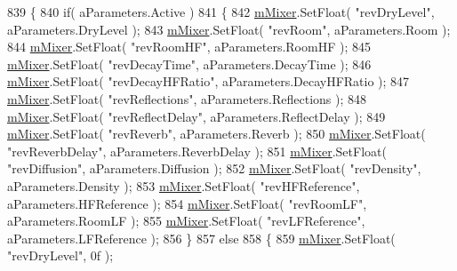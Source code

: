 \begin{DoxyCode}
839     \{
840         \textcolor{keywordflow}{if}( aParameters.Active )
841         \{
842             \hyperlink{group___v_i_m_priv_ga08c8db1bb89f4ab1e28451dd93d6b99c}{mMixer}.SetFloat( \textcolor{stringliteral}{"revDryLevel"}, aParameters.DryLevel );
843             \hyperlink{group___v_i_m_priv_ga08c8db1bb89f4ab1e28451dd93d6b99c}{mMixer}.SetFloat( \textcolor{stringliteral}{"revRoom"}, aParameters.Room );
844             \hyperlink{group___v_i_m_priv_ga08c8db1bb89f4ab1e28451dd93d6b99c}{mMixer}.SetFloat( \textcolor{stringliteral}{"revRoomHF"}, aParameters.RoomHF );
845             \hyperlink{group___v_i_m_priv_ga08c8db1bb89f4ab1e28451dd93d6b99c}{mMixer}.SetFloat( \textcolor{stringliteral}{"revDecayTime"}, aParameters.DecayTime );
846             \hyperlink{group___v_i_m_priv_ga08c8db1bb89f4ab1e28451dd93d6b99c}{mMixer}.SetFloat( \textcolor{stringliteral}{"revDecayHFRatio"}, aParameters.DecayHFRatio );
847             \hyperlink{group___v_i_m_priv_ga08c8db1bb89f4ab1e28451dd93d6b99c}{mMixer}.SetFloat( \textcolor{stringliteral}{"revReflections"}, aParameters.Reflections );
848             \hyperlink{group___v_i_m_priv_ga08c8db1bb89f4ab1e28451dd93d6b99c}{mMixer}.SetFloat( \textcolor{stringliteral}{"revReflectDelay"}, aParameters.ReflectDelay );
849             \hyperlink{group___v_i_m_priv_ga08c8db1bb89f4ab1e28451dd93d6b99c}{mMixer}.SetFloat( \textcolor{stringliteral}{"revReverb"}, aParameters.Reverb );
850             \hyperlink{group___v_i_m_priv_ga08c8db1bb89f4ab1e28451dd93d6b99c}{mMixer}.SetFloat( \textcolor{stringliteral}{"revReverbDelay"}, aParameters.ReverbDelay );
851             \hyperlink{group___v_i_m_priv_ga08c8db1bb89f4ab1e28451dd93d6b99c}{mMixer}.SetFloat( \textcolor{stringliteral}{"revDiffusion"}, aParameters.Diffusion );
852             \hyperlink{group___v_i_m_priv_ga08c8db1bb89f4ab1e28451dd93d6b99c}{mMixer}.SetFloat( \textcolor{stringliteral}{"revDensity"}, aParameters.Density );
853             \hyperlink{group___v_i_m_priv_ga08c8db1bb89f4ab1e28451dd93d6b99c}{mMixer}.SetFloat( \textcolor{stringliteral}{"revHFReference"}, aParameters.HFReference );
854             \hyperlink{group___v_i_m_priv_ga08c8db1bb89f4ab1e28451dd93d6b99c}{mMixer}.SetFloat( \textcolor{stringliteral}{"revRoomLF"}, aParameters.RoomLF );
855             \hyperlink{group___v_i_m_priv_ga08c8db1bb89f4ab1e28451dd93d6b99c}{mMixer}.SetFloat( \textcolor{stringliteral}{"revLFReference"}, aParameters.LFReference );
856         \}
857         \textcolor{keywordflow}{else}
858         \{
859             \hyperlink{group___v_i_m_priv_ga08c8db1bb89f4ab1e28451dd93d6b99c}{mMixer}.SetFloat( \textcolor{stringliteral}{"revDryLevel"}, 0f );

\end{DoxyCode}
